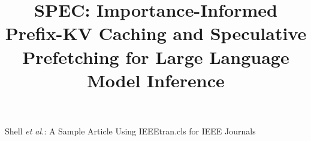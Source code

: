 \documentclass[lettersize,journal]{IEEEtran}
\newcommand{\pname}[1]{SPEC{#1}}
\begin{document}


%
{Shell \MakeLowercase{\textit{et al.}}: A Sample Article Using IEEEtran.cls for IEEE Journals}




\date{}

\title{\Large \bf \pname{}: Importance-Informed Prefix-KV Caching and Speculative Prefetching for Large Language Model Inference}



\maketitle
\pagestyle{empty}









%




\end{document}
